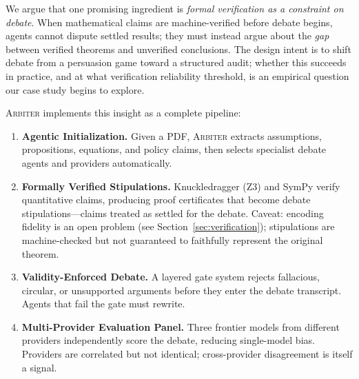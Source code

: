 \documentclass[11pt]{article}
\newcommand{\arbiter}{\textsc{Arbiter}}
\begin{document}
We argue that one promising ingredient is \emph{formal verification as a constraint on debate}.
When mathematical claims are machine-verified before debate begins, agents cannot dispute settled results; they must instead argue about the \emph{gap} between verified theorems and unverified conclusions.
The design intent is to shift debate from a persuasion game toward a structured audit; whether this succeeds in practice, and at what verification reliability threshold, is an empirical question our case study begins to explore.

\arbiter{} implements this insight as a complete pipeline:
\begin{enumerate}[leftmargin=*,itemsep=2pt]
\item \textbf{Agentic Initialization.} Given a PDF, \arbiter{} extracts assumptions, propositions, equations, and policy claims, then selects specialist debate agents and providers automatically.
\item \textbf{Formally Verified Stipulations.} Knuckledragger (Z3) and SymPy verify quantitative claims, producing proof certificates that become debate stipulations---claims treated as settled for the debate. Caveat: encoding fidelity is an open problem (see Section~\ref{sec:verification}); stipulations are machine-checked but not guaranteed to faithfully represent the original theorem.
\item \textbf{Validity-Enforced Debate.} A layered gate system rejects fallacious, circular, or unsupported arguments before they enter the debate transcript. Agents that fail the gate must rewrite.
\item \textbf{Multi-Provider Evaluation Panel.} Three frontier models from different providers independently score the debate, reducing single-model bias. Providers are correlated but not identical; cross-provider disagreement is itself a signal.
\end{enumerate}
\end{document}
